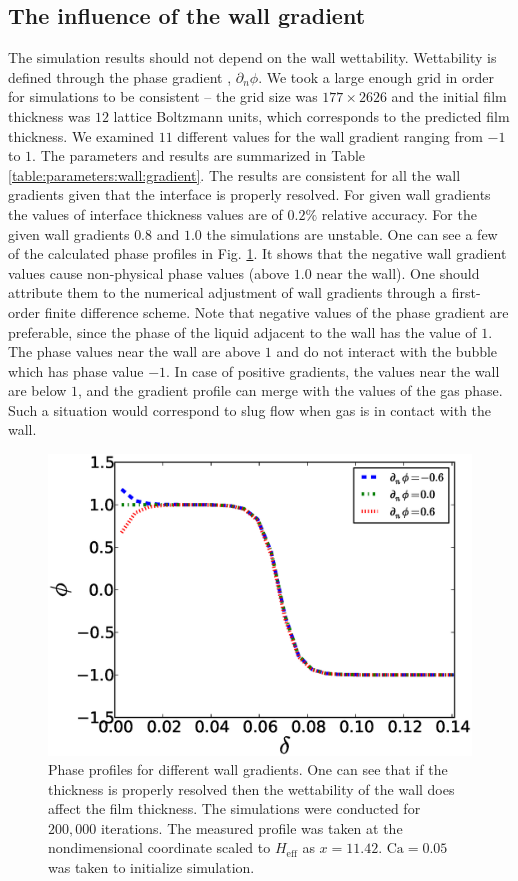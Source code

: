 \documentclass[preprint,12pt]{elsarticle}
\newcommand{\Ca}{\mathrm{Ca}}
\begin{document}
\subsection{The influence of the wall gradient}
The simulation results should not depend on the wall wettability. Wettability is defined
through the phase gradient \cite{pooley-contact}, $\partial_n \phi$.  We took a large
enough grid in order for simulations to be consistent -- the grid size was
$177 \times 2626$ and the initial film thickness was
$12$ lattice Boltzmann units, which corresponds to the predicted film thickness.
We examined $11$ different values for the wall
gradient ranging from $-1$ to $1$. The parameters and results are summarized in Table
\ref{table:parameters:wall:gradient}. The results are consistent for all the
wall gradients given that the interface is properly resolved. For 
given wall gradients the values of interface thickness values are of $0.2\%$ relative accuracy.  For
the given wall gradients $0.8$
and $1.0$ the
simulations are unstable. One can see a few of the calculated phase profiles in Fig.
\ref{fig:gradients:profiles}. It shows that the negative wall gradient values cause 
non-physical phase values (above $1.0$ near the wall). One should attribute them to the numerical
adjustment of wall gradients through a first-order finite difference scheme. Note that
negative values of the phase gradient are
preferable, since the phase of the liquid adjacent to the wall has the value of $1$.
The phase values near the wall are above $1$ and do not interact
with the bubble which has phase value $-1$.  In case of positive
gradients, the values near the wall are below $1$, and the gradient profile can
merge with the values of the gas phase. Such a situation would correspond to  slug flow when gas is
in
contact with the wall.
\begin{figure}
\includegraphics[width=\textwidth]{Figures/Wall/phase_grad_profiles.eps}
\caption{Phase profiles for different wall gradients. One can see that if the thickness
is properly resolved then the wettability of the wall does affect the film thickness. The
simulations were conducted for $200,000$ iterations. The measured profile was taken at the
nondimensional coordinate scaled to $H_{\mathrm{eff}}$ as $x=11.42$. $\Ca=0.05$ was taken to
initialize simulation.
\label{fig:gradients:profiles}
}
\end{figure}
\end{document}
